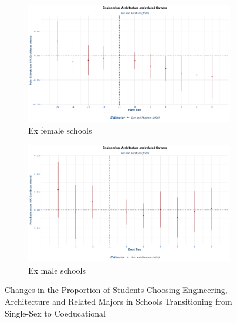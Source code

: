  
\begin{figure}[H]
    \centering
    \begin{subfigure}[b]{0.45\textwidth}
        \centering
        \includegraphics[width=\textwidth]{Graph/Results/stagered_ex_females_ENG_ARCH_RELATED.png}
        \caption{Ex female schools }
        \label{fig:staggered_females_eng}
    \end{subfigure}
    \hfill
    \begin{subfigure}[b]{0.45\textwidth}
        \centering
        \includegraphics[width=\textwidth]{Graph/Results/stagered_ex_males_ENG_ARCH_RELATED.png}
        \caption{Ex male schools }
        \label{fig:staggered_males_eng}
    \end{subfigure}
\caption{ Changes in the Proportion of Students Choosing Engineering, Architecture and  Related Majors in Schools Transitioning from Single-Sex to Coeducational}
    \label{fig:staggered_eng_arch_related}
\end{figure}

